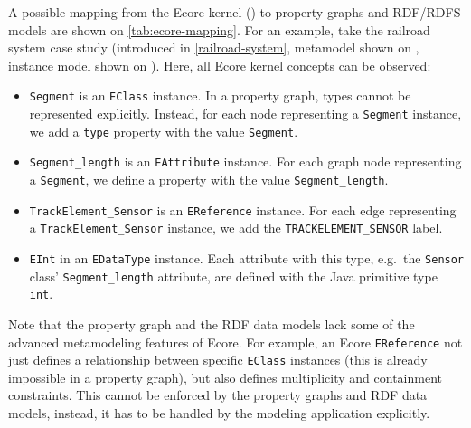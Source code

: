 A possible mapping from the Ecore kernel () to property graphs and RDF/RDFS models are shown on \autoref{tab:ecore-mapping}. For an example, take the railroad system case study (introduced in \autoref{railroad-system}, metamodel shown on , instance model shown on ). Here, all Ecore kernel concepts can be observed:
\begin{itemize}
  \item \verb+Segment+ is an \verb+EClass+ instance. In a property graph, types cannot be represented explicitly. Instead, for each node representing a \verb+Segment+ instance, we add a \verb+type+ property with the value \verb+Segment+.
  \item \verb+Segment_length+ is an \verb+EAttribute+ instance. For each graph node representing a \verb+Segment+, we define a property with the value \verb+Segment_length+.
  \item \verb+TrackElement_Sensor+ is an \verb+EReference+ instance. For each edge representing a \verb+TrackElement_Sensor+ instance, we add the \verb+TRACKELEMENT_SENSOR+ label.
  \item \verb+EInt+ in an \verb+EDataType+ instance. Each attribute with this type, e.g.\ the \verb+Sensor+ class' \verb+Segment_length+ attribute, are defined with the Java primitive type \verb+int+.
\end{itemize}
Note that the property graph and the RDF data models lack some of the advanced metamodeling features of Ecore. For example, an Ecore \verb+EReference+ not just defines a relationship between specific \verb+EClass+ instances (this is already impossible in a property graph), but also defines multiplicity and containment constraints. This cannot be enforced by the property graphs and RDF data models, instead, it has to be handled by the modeling application explicitly. 

